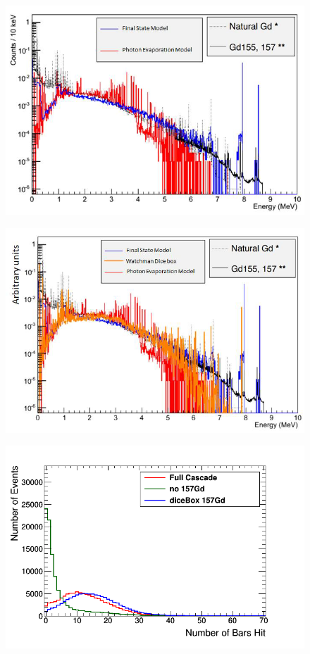 \begin{figure}[H]
 \centering
 \includegraphics[width=0.7\linewidth]{Chapter4/Figs/Raster/gadolinium/comparisonGd.png}
 \label{fig:comparisonGd}
\end{figure}

\begin{figure}[H]
 \centering
 \includegraphics[width=0.7\linewidth]{Chapter4/Figs/Raster/gadolinium/comparisonAndDiceBoxGd.png}
 \label{fig:comparisonAndDiceBoxGd}
\end{figure}
 
\begin{figure}[H]
 \centering
 \includegraphics[width=0.7\linewidth]{Chapter4/Figs/Raster/gadolinium/numberOfBarsHitCascadeFinalStateDicebox.png}
 \label{fig:numberOfBarsHitCascadeFinalStateDicebox}
\end{figure}


